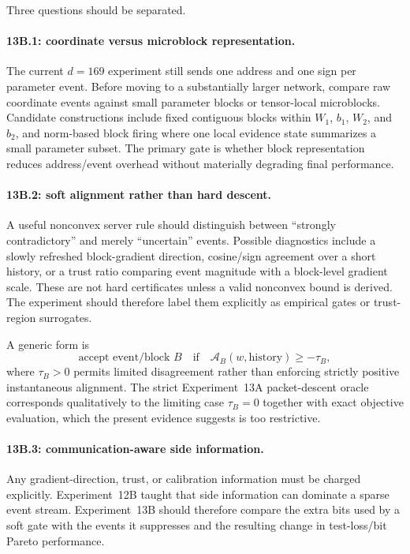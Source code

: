 Three questions should be separated.

\paragraph{13B.1: coordinate versus microblock representation.}
The current $d=169$ experiment still sends one address and one sign per parameter event. Before moving to a substantially larger network, compare raw coordinate events against small parameter blocks or tensor-local microblocks. Candidate constructions include fixed contiguous blocks within $W_1$, $b_1$, $W_2$, and $b_2$, and norm-based block firing where one local evidence state summarizes a small parameter subset. The primary gate is whether block representation reduces address/event overhead without materially degrading final performance.

\paragraph{13B.2: soft alignment rather than hard descent.}
A useful nonconvex server rule should distinguish between ``strongly contradictory'' and merely ``uncertain'' events. Possible diagnostics include a slowly refreshed block-gradient direction, cosine/sign agreement over a short history, or a trust ratio comparing event magnitude with a block-level gradient scale. These are not hard certificates unless a valid nonconvex bound is derived. The experiment should therefore label them explicitly as empirical gates or trust-region surrogates.

A generic form is
\begin{equation}
  \text{accept event/block }B
  \quad\text{if}\quad
  \mathcal A_B(w,\text{history})\geq -\tau_B,
\end{equation}
where $\tau_B>0$ permits limited disagreement rather than enforcing strictly positive instantaneous alignment. The strict Experiment~13A packet-descent oracle corresponds qualitatively to the limiting case $\tau_B=0$ together with exact objective evaluation, which the present evidence suggests is too restrictive.

\paragraph{13B.3: communication-aware side information.}
Any gradient-direction, trust, or calibration information must be charged explicitly. Experiment~12B taught that side information can dominate a sparse event stream. Experiment~13B should therefore compare the extra bits used by a soft gate with the events it suppresses and the resulting change in test-loss/bit Pareto performance.

